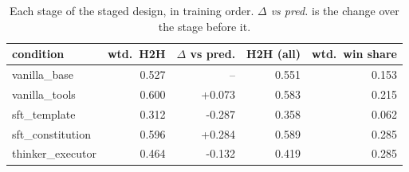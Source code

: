 \begin{table}[htbp]
  \centering
  \caption[Each stage of the staged design, in training order]{Each stage of the staged design, in training order. \emph{$\Delta$ vs pred.} is the change over the stage before it.}
  \label{tab:rank-lineage}
  \begin{tabular}{lrrrr}
    \toprule
    condition & wtd.\ H2H & $\Delta$ vs pred. & H2H (all) & wtd.\ win share \\
    \midrule
    vanilla\_base & 0.527 & -- & 0.551 & 0.153 \\
    vanilla\_tools & 0.600 & +0.073 & 0.583 & 0.215 \\
    sft\_template & 0.312 & -0.287 & 0.358 & 0.062 \\
    sft\_constitution & 0.596 & +0.284 & 0.589 & 0.285 \\
    thinker\_executor & 0.464 & -0.132 & 0.419 & 0.285 \\
    \bottomrule
  \end{tabular}
\end{table}
